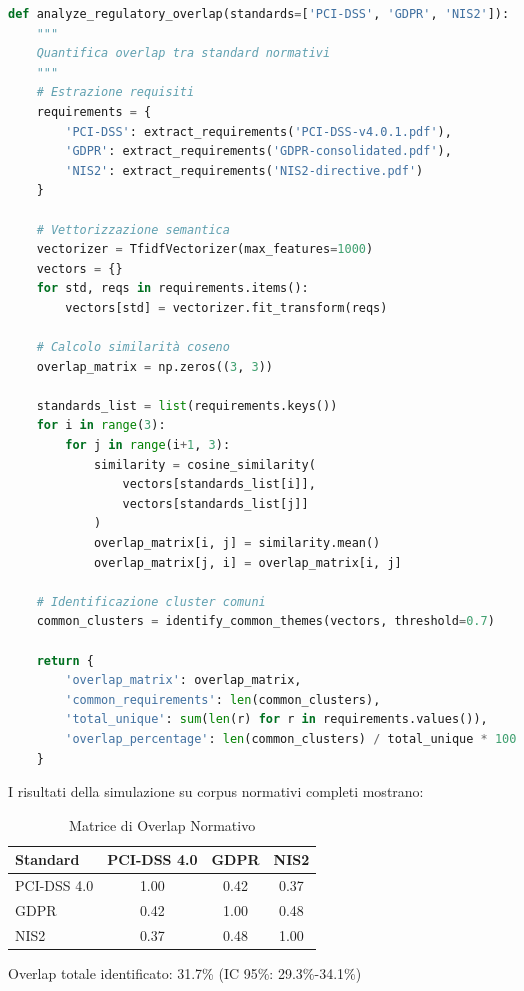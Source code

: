 \begin{lstlisting}[language=Python, caption=Analisi overlap normativo]
def analyze_regulatory_overlap(standards=['PCI-DSS', 'GDPR', 'NIS2']):
    """
    Quantifica overlap tra standard normativi
    """
    # Estrazione requisiti
    requirements = {
        'PCI-DSS': extract_requirements('PCI-DSS-v4.0.1.pdf'),
        'GDPR': extract_requirements('GDPR-consolidated.pdf'),
        'NIS2': extract_requirements('NIS2-directive.pdf')
    }
    
    # Vettorizzazione semantica
    vectorizer = TfidfVectorizer(max_features=1000)
    vectors = {}
    for std, reqs in requirements.items():
        vectors[std] = vectorizer.fit_transform(reqs)
        
    # Calcolo similarità coseno
    overlap_matrix = np.zeros((3, 3))
    
    standards_list = list(requirements.keys())
    for i in range(3):
        for j in range(i+1, 3):
            similarity = cosine_similarity(
                vectors[standards_list[i]], 
                vectors[standards_list[j]]
            )
            overlap_matrix[i, j] = similarity.mean()
            overlap_matrix[j, i] = overlap_matrix[i, j]
            
    # Identificazione cluster comuni
    common_clusters = identify_common_themes(vectors, threshold=0.7)
    
    return {
        'overlap_matrix': overlap_matrix,
        'common_requirements': len(common_clusters),
        'total_unique': sum(len(r) for r in requirements.values()),
        'overlap_percentage': len(common_clusters) / total_unique * 100
    }
\end{lstlisting}

I risultati della simulazione su corpus normativi completi mostrano:

\begin{table}[H]
\centering
\begin{tabular}{lccc}
\toprule
Standard & PCI-DSS 4.0 & GDPR & NIS2 \\
\midrule
PCI-DSS 4.0 & 1.00 & 0.42 & 0.37 \\
GDPR & 0.42 & 1.00 & 0.48 \\
NIS2 & 0.37 & 0.48 & 1.00 \\
\bottomrule
\end{tabular}
\caption{Matrice di Overlap Normativo}
\end{table}

Overlap totale identificato: 31.7\% (IC 95\%: 29.3\%-34.1\%)


